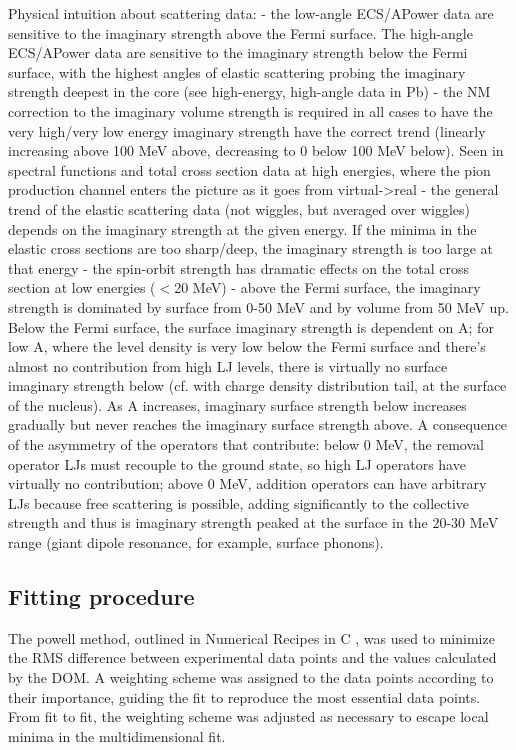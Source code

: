 Physical intuition about scattering data:
- the low-angle ECS/APower data are sensitive to the imaginary strength above
the Fermi surface. The high-angle ECS/APower data are sensitive to the imaginary
strength below the Fermi surface, with the highest angles of elastic scattering
probing the imaginary strength deepest in the core (see high-energy, high-angle
data in Pb)
- the NM correction to the imaginary volume strength is required in all cases to
have the very high/very low energy imaginary strength have the correct trend
(linearly increasing above 100 MeV above, decreasing to 0 below 100 MeV below).
Seen in spectral functions and total cross section data at high energies, where
the pion production channel enters the picture as it goes from virtual->real
- the general trend of the elastic scattering data (not wiggles, but averaged
over wiggles) depends on the imaginary strength at the given energy. If the
minima in the elastic cross sections are too sharp/deep, the imaginary strength
is too large at that energy
- the spin-orbit strength has dramatic effects on the total cross section at low
energies ($<$20 MeV)
- above the Fermi surface, the imaginary strength is dominated by surface from
0-50 MeV and by volume from 50 MeV up. Below the Fermi surface, the surface
imaginary strength is dependent on A; for low A, where the level density is very
low below the Fermi surface and there's almost no contribution from high LJ
levels, there is virtually no surface imaginary strength below (cf. with charge
density distribution tail, at the surface of the nucleus). As A increases, 
imaginary surface strength below increases gradually but never reaches the
imaginary surface strength above. A consequence of the asymmetry of the
operators that contribute: below 0 MeV, the removal operator LJs
must recouple to the ground state, so high LJ operators have virtually no
contribution; above 0 MeV, addition operators can have arbitrary LJs because
free scattering is possible, adding significantly to the collective strength and
thus is imaginary strength peaked at the surface in the 20-30 MeV range (giant
dipole resonance, for example, surface phonons).

\subsection{Fitting procedure}
The powell method, outlined in Numerical Recipes in C \cite{NumericalRecipes},
was used to minimize the RMS difference between experimental data points and the
values calculated by the DOM. A weighting scheme was assigned to the data points
according to their importance, guiding the fit to reproduce the most essential
data points. From fit to fit, the weighting scheme was adjusted as necessary to
escape local minima in the multidimensional fit.

